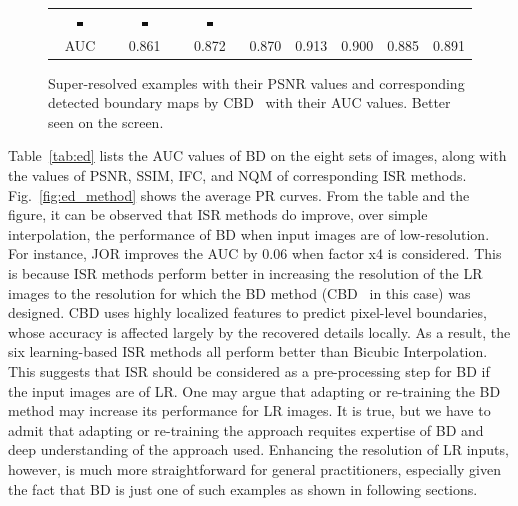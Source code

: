 \begin{figure} [tb]
\begin{tabular*}{\textwidth}{cccccccc}
 \includegraphics[width=0.12\textwidth]{./SR4VT/fig/ed/42049[6-A+]_cbd.jpg} &
 \includegraphics[width=0.12\textwidth]{./SR4VT/fig/ed/42049[7-JOR]_cbd.jpg} &
 \includegraphics[width=0.12\textwidth]{./SR4VT/fig/ed/42049[8-SRF]_cbd.jpg} \\
    AUC & 0.861 & 0.872 & 0.870 & 0.913 & 0.900 & 0.885 & 0.891 \\
\end{tabular*}
   \caption{Super-resolved examples with their PSNR values and corresponding 
detected boundary maps by CBD~\cite{isola2014crisp} with their AUC values. 
Better seen on the screen. }
\label{fig:ed_cbd}
\end{figure}


Table~\ref{tab:ed} lists the AUC values of BD on the eight sets of
images, along with the values of PSNR, SSIM, IFC, and NQM of
corresponding ISR methods. Fig.~\ref{fig:ed_method} shows the average
PR curves. From the table and the figure, it can be observed that ISR
methods do improve, over simple interpolation, the performance of BD
when input images are of low-resolution. For instance, JOR improves
the AUC by 0.06 when factor x4 is considered. This is because ISR
methods perform better in increasing the resolution of the LR images
to the resolution for which the BD method (CBD~\cite{isola2014crisp}
in this case) was designed. CBD uses highly localized features to
predict pixel-level boundaries, whose accuracy is affected largely by
the recovered details locally. As a result, the six learning-based
ISR methods all perform better than Bicubic Interpolation.  This
suggests that ISR should be considered as a pre-processing step for 
BD if the input images are of LR. One may argue that adapting or
re-training the BD method may increase its performance for LR images.
It is true, but we have to admit that adapting or re-training the
approach requites expertise of BD and deep understanding of the
approach used. Enhancing the resolution of LR inputs, however, is much
more straightforward for general practitioners, especially given the fact that BD is just one of
such examples as shown in following sections.

